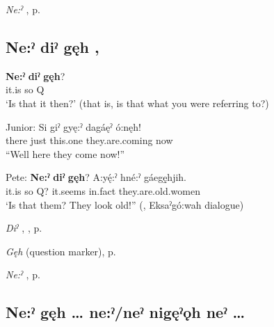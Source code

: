 \begin{CayugaRelated}
\item \textit{Ne:ˀ} , p. \pageref{p:[ne:ˀ] `it is’}
\end{CayugaRelated}

\subsection*{\textbf{Ne:ˀ diˀ gęh} , } \label{p:[ne:ˀ diˀ gęh]}

\ea
\label{ex:npar47}
\gll \textbf{Ne:ˀ} \textbf{diˀ} \textbf{gęh}?\\
it.is so Q\\
\glt ‘Is that it then?’ (that is, is that what you were referring to?)
\z

\ea
\label{ex:npar48}
\gll Junior: Si giˀ gyę:ˀ dagáęˀ ó:nęh!\\
{} there just this.one they.are.coming now\\
\glt “Well here they come now!”

\gll Pete: \textbf{Ne:ˀ} \textbf{diˀ} \textbf{gęh}? A:yę́:ˀ hné:ˀ gáegę̱hjih.\\
{} it.is so Q? it.seems in.fact they.are.old.women\\
\glt ‘Is that them? They look old!” (\cite[88]{mithun_watewayestanih_1984}, Eksaˀgó:wah dialogue)
\z

\begin{CayugaRelated}
\item \textit{Diˀ} , , p. \pageref{p:[diˀ]}\\
\item \textit{Gęh}  (question marker), p. \pageref{p:[gęh] `Q’}\\
\item \textit{Ne:ˀ} , p. \pageref{p:[ne:ˀ] `it is’}
\end{CayugaRelated}

\subsection*{\textbf{Ne:ˀ gęh … ne:ˀ/neˀ nigęˀǫh neˀ …} } \label{p:[ne:ˀ gęh … ne:ˀ]}

